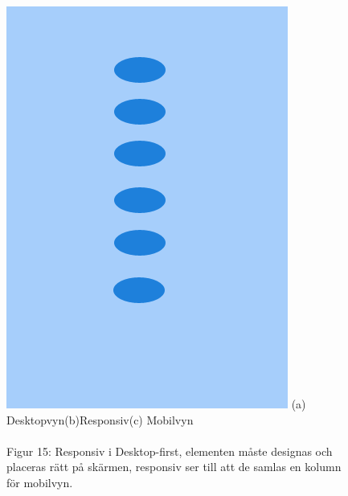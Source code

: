 \documentclass[11pt]{article}
\begin{document}
\begin{figure}[H]
{\includegraphics[scale=0.3]{pics/mobiledots.png}%
}
\hspace{1.7cm}(a) Desktopvyn\hspace{2.3cm}(b)Responsiv\hspace{2.1cm}(c) Mobilvyn
\\\\
\hspace{0.15cm}Figur 15: Responsiv i Desktop-first, elementen måste designas och placeras rätt på skärmen, responsiv ser till att de samlas en kolumn för mobilvyn.
\end{figure}
\end{document}
